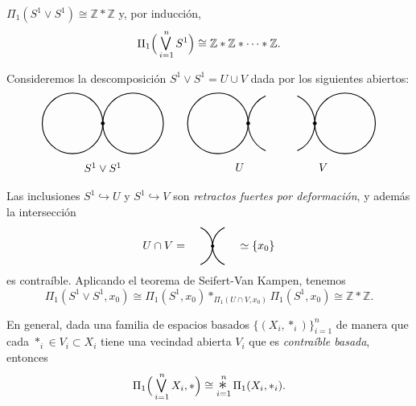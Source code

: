 \begin{prop}
$\Pi_1(S^1 \vee S^1) \cong \mathbb{Z} \ast \mathbb{Z}$ y, por inducción,
\[
\Pi_1\Big( \medvee_{i=1}^n S^1 \Big) \cong {\mathbb{Z} \ast \mathbb{Z} \ast \dots \ast \mathbb{Z}}.
\]
\end{prop}

\begin{dem}
Consideremos la descomposición $S^1 \vee S^1 = U \cup V$ dada por los siguientes abiertos:
\[
\begin{tikzpicture}[scale=0.95]
    \begin{scope}[shift={(0,0)}]
        \draw[thick] (-1,0) circle (1);
        \draw[thick] (1,0) circle (1);
        \filldraw (0,0) circle (1.6pt);
        \node at (0, -1.45) {$S^1 \vee S^1$};
    \end{scope}

    \begin{scope}[shift={(4.8,0)}]
        \node[left] at (0,-1.45) {$U$};
        \draw[thick] (-1,0) circle (1);
        \draw[thick] (1,0) ++(115:1) arc (115:245:1);
        \filldraw (0,0) circle (1.6pt);
    \end{scope}

    \begin{scope}[shift={(7,0)}]
        \draw[thick] (-1,0) ++(-65:1) arc (-65:65:1);
        \draw[thick] (1,0) circle (1);
        \filldraw (0,0) circle (1.6pt);
        \node[right] at (0,-1.45) {$V$};
    \end{scope}
\end{tikzpicture}
\]
Las inclusiones $S^1 \hookrightarrow U$ y $S^1 \hookrightarrow V$ son \textit{retractos fuertes por deformación}, y además la intersección
\[
U \cap V = \;
\begin{tikzpicture}[baseline=-0.6ex, scale=0.65]
    \draw[thick] (-1,0) ++(-65:1) arc (-65:65:1);
    \draw[thick] (1,0) ++(115:1) arc (115:245:1);
    \filldraw (0,0) circle (2pt);
\end{tikzpicture}
\; \simeq \{x_0\}
\]
es contraíble. Aplicando el teorema de Seifert-Van Kampen, tenemos
\[
\Pi_1(S^1 \vee S^1, x_0) \cong \Pi_1(S^1, x_0) {\ast}_{\Pi_1(U \cap V, x_0)} \Pi_1(S^1, x_0) \cong \mathbb{Z} \ast \mathbb{Z}.
\]
\end{dem}

\begin{nota}
En general, dada una familia de espacios basados $\{(X_i, *_i)\}_{i=1}^n$ de manera que cada $*_i \in V_i \subset X_i$ tiene una vecindad abierta $V_i$ que es \textit{contraíble basada}, entonces
\[
\Pi_1\Big( \medvee_{i=1}^n X_i, * \Big) \cong \mathop{\scalebox{1.5}{$\ast$}}_{i=1}^n \Pi_1(X_i, *_i).
\]
\end{nota}

